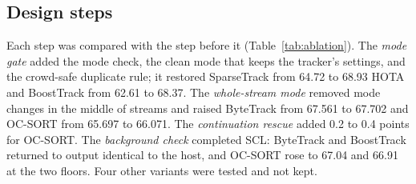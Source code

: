 \documentclass[pdflatex,sn-mathphys-num,iicol]{sn-jnl}
\newcommand{\scl}{SCL}
\begin{document}
\subsection{Design steps}\label{sec:steps}
Each step was compared with the step before it (Table~\ref{tab:ablation}). The \emph{mode gate}
added the mode check, the clean mode that keeps the tracker's settings, and the crowd-safe duplicate
rule; it restored SparseTrack from 64.72 to 68.93 HOTA and BoostTrack from 62.61 to 68.37. The
\emph{whole-stream mode} removed mode changes in the middle of streams and raised ByteTrack from
67.561 to 67.702 and OC-SORT from 65.697 to 66.071. The \emph{continuation rescue} added 0.2 to 0.4
points for OC-SORT. The \emph{background check} completed \scl{}: ByteTrack and BoostTrack returned
to output identical to the host, and OC-SORT rose to 67.04 and 66.91 at the two floors. Four other
variants were tested and not kept.
\end{document}
